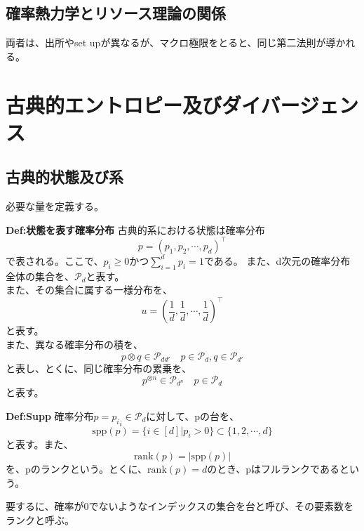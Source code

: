 \documentclass[a4paper,11pt]{jsarticle}
\numberwithin{equation}{section}
\begin{document}
\subsection{確率熱力学とリソース理論の関係}
両者は、出所やset upが異なるが、マクロ極限をとると、同じ第二法則が導かれる。\\

\newpage
\section{古典的エントロピー及びダイバージェンス}
\subsection{古典的状態及び系}
必要な量を定義する。\\
\begin{itembox}[l]{\textbf{Def:状態を表す確率分布}}
    古典的系における状態は確率分布
    \begin{equation}
        p = (p_1, p_2, \cdots, p_d)^{\top}
    \end{equation}
    で表される。ここで、$p_i \geq 0$かつ$\sum_{i=1}^{d}p_i = 1$である。
    また、d次元の確率分布全体の集合を、$\mathcal{P}_d$と表す。\\
    また、その集合に属する一様分布を、
    \begin{equation}
        u = \left(\frac{1}{d}, \frac{1}{d}, \cdots, \frac{1}{d}\right)^{\top}
    \end{equation}
    と表す。\\
    また、異なる確率分布の積を、
    \begin{equation}
        p \otimes q \in \mathcal{P}_{dd'} \quad p \in \mathcal{P}_d, q \in \mathcal{P}_{d'}
    \end{equation}
    と表し、とくに、同じ確率分布の累乗を、
    \begin{equation}
        p^{\otimes n} \in \mathcal{P}_{d^n} \quad p \in \mathcal{P}_d
    \end{equation}
    と表す。
\end{itembox}

\begin{itembox}[l]{\textbf{Def:Supp}}
    確率分布$p ={p_i}_i \in \mathcal{P}_d$に対して、pの台を、
    \begin{equation}
        \text{spp}(p) = \{i \in [d] | p_i > 0\} \subset \{1, 2, \cdots, d\}
    \end{equation}
    と表す。また、
    \begin{equation}
        \text{rank}(p) = |\text{spp}(p)|
    \end{equation}
    を、pのランクという。とくに、$\text{rank}(p) = d$のとき、pはフルランクであるという。
\end{itembox}
要するに、確率が0でないようなインデックスの集合を台と呼び、その要素数をランクと呼ぶ。\\
\end{document}
